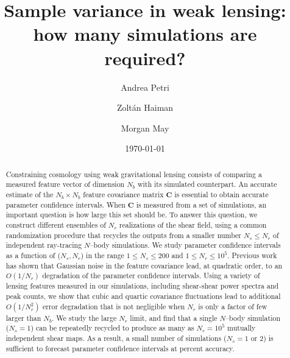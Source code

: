\documentclass[reprint,aps,prd,superscriptaddress,showkeys,showpacs]{revtex4-1}
\newcommand{\bb}[1]{\mathbf{#1}}
\begin{document}
\title{Sample variance in weak lensing: how many simulations are required?}

\author{Andrea Petri}

\author{Zolt\'an Haiman}

\author{Morgan May}

\date{\today}

\label{firstpage}

\begin{abstract}

Constraining cosmology using weak gravitational lensing consists of
comparing a measured feature vector of dimension $N_b$ with its
simulated counterpart. An accurate estimate of the $N_b\times N_b$
feature covariance matrix $\bb{C}$ is essential to obtain accurate
parameter confidence intervals. When $\bb{C}$ is measured from a set
of simulations, an important question is how large this set should
be. To answer this question, we construct different ensembles of $N_r$
realizations of the shear field, using a common randomization
procedure that recycles the outputs from a smaller number $N_s\leq
N_r$ of independent ray-tracing $N$--body simulations.  We study
parameter confidence intervals as a function of ($N_s,N_r$) in the
range $1\leq N_s\leq 200$ and $1\leq N_r\leq 10^5$.  Previous work
\citep{DodelsonSchneider13} has shown that Gaussian noise in the
feature covariance lead, at quadratic order, to an $O(1/N_r)$
degradation of the parameter confidence intervals. Using a variety of
lensing features measured in our simulations, including shear-shear
power spectra and peak counts, we show that cubic and quartic
covariance fluctuations lead to additional $O(1/N_r^2)$ error
degradation that is not negligible when $N_r$ is only a factor of few
larger than $N_b$. We study the large $N_r$ limit, and find that a
single $N$--body simulation ($N_s=1$) can be repeatedly recycled to
produce as many as $N_r=10^5$ mutually independent shear maps. As a
result, a small number of simulations ($N_s=1$ or $2$) is sufficient
to forecast parameter confidence intervals at percent
accuracy. 

\end{abstract}
\end{document}
